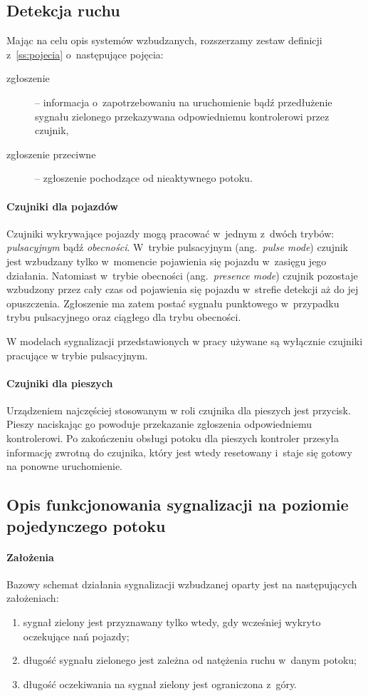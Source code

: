 \documentclass{pracamgr}
\newcommand{\ang}[1]{(ang.~\emph{#1})}
\theoremstyle{plain}
\begin{document}
\subsection{Detekcja ruchu}
\label{ss:detekcja} Mając na celu opis systemów wzbudzanych,
rozszerzamy zestaw definicji z~\ref{ss:pojecia} o~następujące
pojęcia:
\begin{description}
  \item[zgłoszenie] -- informacja o~zapotrzebowaniu na uruchomienie
  bądź przedłużenie sygnału zielonego przekazywana odpowiedniemu
  kontrolerowi przez czujnik,
  \item[zgłoszenie przeciwne] -- zgłoszenie pochodzące od nieaktywnego
  potoku.
\end{description}

\paragraph{Czujniki dla pojazdów} Czujniki wykrywające pojazdy mogą
pracować w~jednym z~dwóch trybów: \emph{pulsacyjnym} bądź
\emph{obecności}.  W~trybie pulsacyjnym \ang{pulse mode} czujnik jest
wzbudzany tylko w~momencie pojawienia się pojazdu w~zasięgu jego
działania.  Natomiast w~trybie obecności \ang{presence mode} czujnik
pozostaje wzbudzony przez cały czas od pojawienia się pojazdu
w~strefie detekcji aż do jej opuszczenia. Zgłoszenie ma zatem postać
sygnału punktowego w~przypadku trybu pulsacyjnego oraz ciągłego dla
trybu obecności.

W modelach sygnalizacji przedstawionych w pracy używane są wyłącznie
czujniki pracujące w trybie pulsacyjnym.

\paragraph{Czujniki dla pieszych} Urządzeniem najczęściej stosowanym w
roli czujnika dla pieszych jest przycisk. Pieszy naciskając go powoduje
przekazanie zgłoszenia odpowiedniemu kontrolerowi. Po zakończeniu
obsługi potoku dla pieszych kontroler przesyła informację zwrotną do
czujnika, który jest wtedy resetowany i~staje się gotowy na ponowne
uruchomienie.

\subsection{Opis funkcjonowania sygnalizacji na poziomie pojedynczego
potoku}
\label{ss:schemat}

\paragraph{Założenia} Bazowy schemat działania sygnalizacji wzbudzanej
oparty jest na następujących założeniach:
\begin{enumerate}
  \item sygnał zielony jest przyznawany tylko wtedy, gdy wcześniej
  wykryto oczekujące nań pojazdy;
  \item długość sygnału zielonego jest zależna od natężenia ruchu
  w~danym potoku;
  \item długość oczekiwania na sygnał zielony jest ograniczona z~góry.
\end{enumerate}
\end{document}
